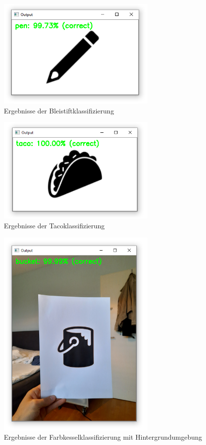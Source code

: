 \begin{figure}[H]
  \includegraphics[width=0.7\textwidth]{img/piktogrammerkennung/classifiedPen.png}
  \centering
  \caption{Ergebnisse der Bleistiftklassifizierung}
\end{figure}
   
\begin{figure}[H]
  \includegraphics[width=0.7\textwidth]{img/piktogrammerkennung/classifiedTaco.png}
  \centering
  \caption{Ergebnisse der Tacoklassifizierung}
\end{figure}
   
\begin{figure}[H]
  \includegraphics[width=0.7\textwidth]{img/piktogrammerkennung/classifiedBucketBG.png}
  \centering
  \caption{Ergebnisse der Farbkesselklassifizierung mit Hintergrundumgebung}
\end{figure}

